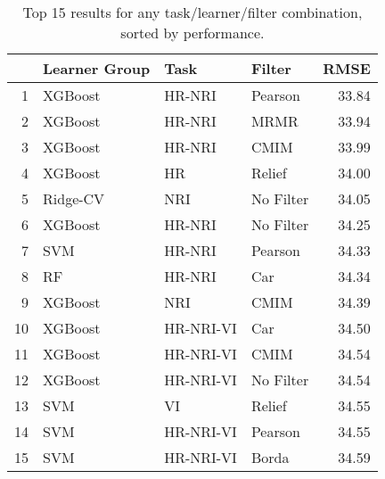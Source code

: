 \begin{table}[ht!]
\centering
\caption{Top 15 results for any task/learner/filter combination, sorted by performance.} 
\label{tab:perf-top-15}
\begin{tabular}{rlllr}
  \hline
 & Learner Group & Task & Filter & RMSE \\ 
  \hline
1 & XGBoost & HR-NRI & Pearson & 33.84 \\ 
  2 & XGBoost & HR-NRI & MRMR & 33.94 \\ 
  3 & XGBoost & HR-NRI & CMIM & 33.99 \\ 
  4 & XGBoost & HR & Relief & 34.00 \\ 
  5 & Ridge-CV & NRI & No Filter & 34.05 \\ 
  6 & XGBoost & HR-NRI & No Filter & 34.25 \\ 
  7 & SVM & HR-NRI & Pearson & 34.33 \\ 
  8 & RF & HR-NRI & Car & 34.34 \\ 
  9 & XGBoost & NRI & CMIM & 34.39 \\ 
  10 & XGBoost & HR-NRI-VI & Car & 34.50 \\ 
  11 & XGBoost & HR-NRI-VI & CMIM & 34.54 \\ 
  12 & XGBoost & HR-NRI-VI & No Filter & 34.54 \\ 
  13 & SVM & VI & Relief & 34.55 \\ 
  14 & SVM & HR-NRI-VI & Pearson & 34.55 \\ 
  15 & SVM & HR-NRI-VI & Borda & 34.59 \\ 
   \hline
\end{tabular}
\end{table}
